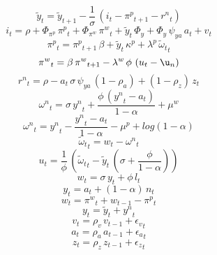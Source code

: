 \begin{dmath}
{{\tilde{y}}_{t}}={{\tilde{y}}_{t+1}}-\frac{1}{{{\sigma}}}\, \left({{i}_{t}}-{{\pi^p}_{t+1}}-{{r^n}_{t}}\right)
\end{dmath}
\begin{dmath}
{{i}_{t}}={{\rho}}+{{\Phi_{\pi^p}}}\, {{\pi^p}_{t}}+{{\Phi_{\pi^w}}}\, {{\pi^w}_{t}}+{{\tilde{y}}_{t}}\, {{\Phi_{y}}}+{{\Phi_{y}}}\, {{\psi_{ya}}}\, {{a}_{t}}+{{v}_{t}}
\end{dmath}
\begin{dmath}
{{\pi^p}_{t}}={{\pi^p}_{t+1}}\, {{\beta}}+{{\tilde{y}}_{t}}\, {{\kappa^p}}+{{\lambda^p}}\, {{\tilde{\omega}_t}_{t}}
\end{dmath}
\begin{dmath}
{{\pi^w}_{t}}={{\beta}}\, {{\pi^w}_{t+1}}-{{\lambda^w}}\, {{\phi}}\, \left({{u}_{t}}-{{\u_n}}\right)
\end{dmath}
\begin{dmath}
{{r^n}_{t}}={{\rho}}-{{a}_{t}}\, {{\sigma}}\, {{\psi_{ya}}}\, \left(1-{{\rho_a}}\right)+\left(1-{{\rho_z}}\right)\, {{z}_{t}}
\end{dmath}
\begin{dmath}
{{\omega^n}_{t}}={{\sigma}}\, {{y^n}_{t}}+\frac{{{\phi}}\, \left({{y^n}_{t}}-{{a}_{t}}\right)}{1-{{\alpha}}}+{{\mu^w}}
\end{dmath}
\begin{dmath}
{{\omega^n}_{t}}={{y^n}_{t}}-\frac{{{y^n}_{t}}-{{a}_{t}}}{1-{{\alpha}}}-{{\mu^p}}+log\left(1-{{\alpha}}\right)
\end{dmath}
\begin{dmath}
{{\tilde{\omega}_t}_{t}}={{w}_{t}}-{{\omega^n}_{t}}
\end{dmath}
\begin{dmath}
{{u}_{t}}=\frac{1}{{{\phi}}}\, \left({{\tilde{\omega}_t}_{t}}-{{\tilde{y}}_{t}}\, \left({{\sigma}}+\frac{{{\phi}}}{1-{{\alpha}}}\right)\right)
\end{dmath}
\begin{dmath}
{{w}_{t}}={{\sigma}}\, {{y}_{t}}+{{\phi}}\, {{l}_{t}}
\end{dmath}
\begin{dmath}
{{y}_{t}}={{a}_{t}}+\left(1-{{\alpha}}\right)\, {{n}_{t}}
\end{dmath}
\begin{dmath}
{{w}_{t}}={{\pi^w}_{t}}+{{w}_{t-1}}-{{\pi^p}_{t}}
\end{dmath}
\begin{dmath}
{{y}_{t}}={{\tilde{y}}_{t}}+{{y^n}_{t}}
\end{dmath}
\begin{dmath}
{{v}_{t}}={{\rho_v}}\, {{v}_{t-1}}+{{\epsilon_v}_{t}}
\end{dmath}
\begin{dmath}
{{a}_{t}}={{\rho_a}}\, {{a}_{t-1}}+{{\epsilon_a}_{t}}
\end{dmath}
\begin{dmath}
{{z}_{t}}={{\rho_z}}\, {{z}_{t-1}}+{{\epsilon_z}_{t}}
\end{dmath}
